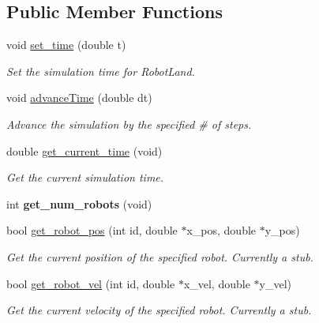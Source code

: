 \subsection*{Public Member Functions}
\begin{DoxyCompactItemize}
\item 
void \hyperlink{classrobot__land_a9b759efccbcae2be07ead240caec14cf}{set\+\_\+time} (double t)
\begin{DoxyCompactList}\small\item\em Set the simulation time for Robot\+Land. \end{DoxyCompactList}\item 
void \hyperlink{classrobot__land_af48446e7dafcf509fd3c13e66e17466b}{advance\+Time} (double dt)
\begin{DoxyCompactList}\small\item\em Advance the simulation by the specified \# of steps. \end{DoxyCompactList}\item 
\mbox{\label{classrobot__land_a9469257602322310502bfe0298bea0e4}} 
double \hyperlink{classrobot__land_a9469257602322310502bfe0298bea0e4}{get\+\_\+current\+\_\+time} (void)
\begin{DoxyCompactList}\small\item\em Get the current simulation time. \end{DoxyCompactList}\item 
\mbox{\label{classrobot__land_a604710cec501348f61c009ed9066232e}} 
int {\bfseries get\+\_\+num\+\_\+robots} (void)
\item 
bool \hyperlink{classrobot__land_a600cee26e615092e6425e5f1f8544d8b}{get\+\_\+robot\+\_\+pos} (int id, double $\ast$x\+\_\+pos, double $\ast$y\+\_\+pos)
\begin{DoxyCompactList}\small\item\em Get the current position of the specified robot. Currently a stub. \end{DoxyCompactList}\item 
bool \hyperlink{classrobot__land_a2c12e8cb4cea6ca18db18b30b205b6a8}{get\+\_\+robot\+\_\+vel} (int id, double $\ast$x\+\_\+vel, double $\ast$y\+\_\+vel)
\begin{DoxyCompactList}\small\item\em Get the current velocity of the specified robot. Currently a stub. \end{DoxyCompactList}\item 

\end{DoxyCompactItemize}
